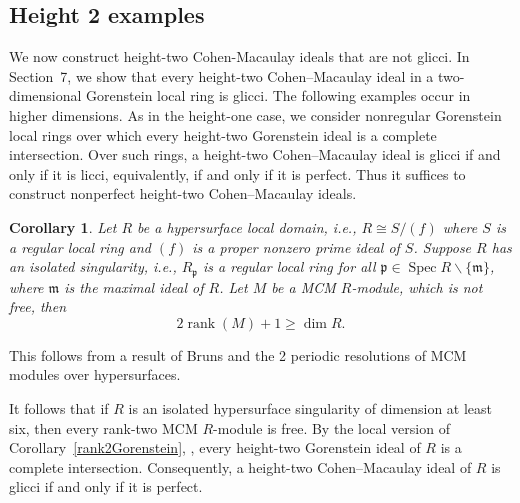 \documentclass[11pt,letterpaper]{amsart}
\DeclareMathOperator{\Ass}{Ass}
\DeclareMathOperator{\Spec}{Spec}
\DeclareMathOperator{\rank}{rank}
\theoremstyle{plain}
\newtheorem{thm}{Theorem}[section]
\newtheorem{cor}[thm]{Corollary}
\theoremstyle{definition}
\theoremstyle{remark}
\begin{document}
\subsection{Height 2 
examples}
We now construct height-two Cohen-Macaulay ideals that are not glicci. In Section~7, we show that every height-two Cohen–Macaulay ideal in a two-dimensional Gorenstein local ring is glicci. The following examples occur in higher dimensions. As in the height-one case, we consider nonregular Gorenstein local rings over which every height-two Gorenstein ideal is a complete intersection. Over such rings, a height-two Cohen–Macaulay ideal is glicci if and only if it is licci, equivalently, if and only if it is perfect. Thus it suffices to construct nonperfect height-two Cohen–Macaulay ideals.

 
\begin{cor}\cite[3.4]{herzog1987maximal}\label{herzogrankisolatedsing} Let $R$ be a hypersurface local domain, i.e., $R\cong S/(f)$ where $S$ is a regular local ring and $(f)$ is a proper nonzero prime ideal of $S$. Suppose $R$ has an isolated singularity, i.e., $R_\mathfrak p$ is a regular local ring for all $\mathfrak p\in\Spec R\backslash \{\mathfrak m\}$, where $\mathfrak m$ is the maximal ideal of $R$. Let $M$ be a MCM $R$-module, which is not free, then $$2\rank(M)+1\ge \dim R.$$   
\end{cor}

This follows from a result of Bruns \cite[Corollary~2]{bruns1981eisenbud} and the 2 periodic resolutions of MCM modules over hypersurfaces. 

It follows that if \(R\) is an isolated hypersurface singularity of dimension at least six, then every rank-two MCM \(R\)-module is free. By the local version of Corollary~\ref{rank2Gorenstein}, \cite[Proposition~1.9]{herzog1987maximal}, every height-two Gorenstein ideal of \(R\) is a complete intersection. Consequently, a height-two Cohen–Macaulay ideal of \(R\) is glicci if and only if it is perfect.
\end{document}
